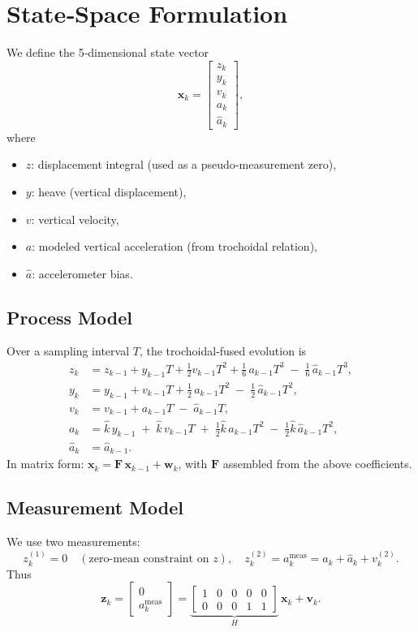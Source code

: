 \documentclass[12pt]{article}
\begin{document}
\section{State‐Space Formulation}
We define the 5‐dimensional state vector
\[
\mathbf{x}_k = 
\begin{bmatrix}
z_k \\ y_k \\ v_k \\ a_k \\ \hat a_k
\end{bmatrix},
\]
where
\begin{itemize}
  \item \(z\): displacement integral (used as a pseudo‐measurement zero),
  \item \(y\): heave (vertical displacement),
  \item \(v\): vertical velocity,
  \item \(a\): modeled vertical acceleration (from trochoidal relation),
  \item \(\hat a\): accelerometer bias.
\end{itemize}

\subsection{Process Model}
Over a sampling interval \(T\), the trochoidal‐fused evolution is
\[
\begin{aligned}
z_k &= z_{k-1} + y_{k-1}T + \tfrac12v_{k-1}T^2 + \tfrac16\,a_{k-1}T^3 \;-\;\tfrac16\,\hat a_{k-1}T^3,\\
y_k &= y_{k-1} + v_{k-1}T + \tfrac12\,a_{k-1}T^2 \;-\;\tfrac12\,\hat a_{k-1}T^2,\\
v_k &= v_{k-1} + a_{k-1}T \;-\;\hat a_{k-1}T,\\
a_k &= \hat{k}\,y_{k-1} \;+\;\hat{k}\,v_{k-1}T \;+\;\tfrac12\hat{k}\,a_{k-1}T^2 \;-\;\tfrac12\hat{k}\,\hat a_{k-1}T^2,\\
\hat a_k &= \hat a_{k-1}.
\end{aligned}
\]
In matrix form: \(\mathbf{x}_k = \mathbf{F}\,\mathbf{x}_{k-1} + \mathbf{w}_k\), with \(\mathbf{F}\) assembled from the above coefficients.

\subsection{Measurement Model}
We use two measurements:
\[
z^{(1)}_k = 0 \quad(\text{zero‐mean constraint on }z), 
\quad
z^{(2)}_k = a^{\mathrm{meas}}_k = a_k + \hat a_k + v^{(2)}_k.
\]
Thus
\[
\mathbf{z}_k = 
\begin{bmatrix}0 \\ a^{\mathrm{meas}}_k\end{bmatrix}
= 
\underbrace{\begin{bmatrix}1&0&0&0&0\\0&0&0&1&1\end{bmatrix}}_{\!H\!}
\,\mathbf{x}_k + \mathbf{v}_k.
\]
\end{document}
